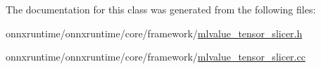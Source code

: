 The documentation for this class was generated from the following files\+:\begin{DoxyCompactItemize}
\item 
onnxruntime/onnxruntime/core/framework/\mbox{\hyperlink{mlvalue__tensor__slicer_8h}{mlvalue\+\_\+tensor\+\_\+slicer.\+h}}\item 
onnxruntime/onnxruntime/core/framework/\mbox{\hyperlink{mlvalue__tensor__slicer_8cc}{mlvalue\+\_\+tensor\+\_\+slicer.\+cc}}\end{DoxyCompactItemize}
